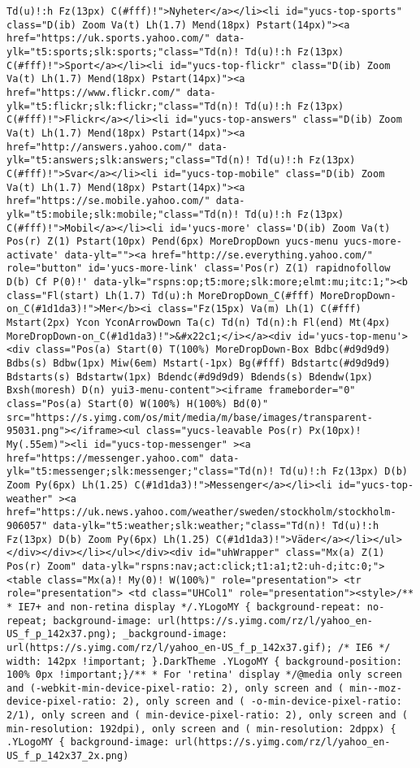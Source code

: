 \begin{verbatim}
Td(u)!:h Fz(13px) C(#fff)!">Nyheter</a></li><li id="yucs-top-sports" class="D(ib) Zoom Va(t) Lh(1.7) Mend(18px) Pstart(14px)"><a href="https://uk.sports.yahoo.com/" data-ylk="t5:sports;slk:sports;"class="Td(n)! Td(u)!:h Fz(13px) C(#fff)!">Sport</a></li><li id="yucs-top-flickr" class="D(ib) Zoom Va(t) Lh(1.7) Mend(18px) Pstart(14px)"><a href="https://www.flickr.com/" data-ylk="t5:flickr;slk:flickr;"class="Td(n)! Td(u)!:h Fz(13px) C(#fff)!">Flickr</a></li><li id="yucs-top-answers" class="D(ib) Zoom Va(t) Lh(1.7) Mend(18px) Pstart(14px)"><a href="http://answers.yahoo.com/" data-ylk="t5:answers;slk:answers;"class="Td(n)! Td(u)!:h Fz(13px) C(#fff)!">Svar</a></li><li id="yucs-top-mobile" class="D(ib) Zoom Va(t) Lh(1.7) Mend(18px) Pstart(14px)"><a href="https://se.mobile.yahoo.com/" data-ylk="t5:mobile;slk:mobile;"class="Td(n)! Td(u)!:h Fz(13px) C(#fff)!">Mobil</a></li><li id='yucs-more' class='D(ib) Zoom Va(t) Pos(r) Z(1) Pstart(10px) Pend(6px) MoreDropDown yucs-menu yucs-more-activate' data-ylt=""><a href="http://se.everything.yahoo.com/" role="button" id='yucs-more-link' class='Pos(r) Z(1) rapidnofollow D(b) Cf P(0)!' data-ylk="rspns:op;t5:more;slk:more;elmt:mu;itc:1;"><b class="Fl(start) Lh(1.7) Td(u):h MoreDropDown_C(#fff) MoreDropDown-on_C(#1d1da3)!">Mer</b><i class="Fz(15px) Va(m) Lh(1) C(#fff) Mstart(2px) Ycon YconArrowDown Ta(c) Td(n) Td(n):h Fl(end) Mt(4px) MoreDropDown-on_C(#1d1da3)!">&#x22c1;</i></a><div id='yucs-top-menu'><div class="Pos(a) Start(0) T(100%) MoreDropDown-Box Bdbc(#d9d9d9) Bdbs(s) Bdbw(1px) Miw(6em) Mstart(-1px) Bg(#fff) Bdstartc(#d9d9d9) Bdstarts(s) Bdstartw(1px) Bdendc(#d9d9d9) Bdends(s) Bdendw(1px) Bxsh(moresh) D(n) yui3-menu-content"><iframe frameborder="0" class="Pos(a) Start(0) W(100%) H(100%) Bd(0)" src="https://s.yimg.com/os/mit/media/m/base/images/transparent-95031.png"></iframe><ul class="yucs-leavable Pos(r) Px(10px)! My(.55em)"><li id="yucs-top-messenger" ><a href="https://messenger.yahoo.com" data-ylk="t5:messenger;slk:messenger;"class="Td(n)! Td(u)!:h Fz(13px) D(b) Zoom Py(6px) Lh(1.25) C(#1d1da3)!">Messenger</a></li><li id="yucs-top-weather" ><a href="https://uk.news.yahoo.com/weather/sweden/stockholm/stockholm-906057" data-ylk="t5:weather;slk:weather;"class="Td(n)! Td(u)!:h Fz(13px) D(b) Zoom Py(6px) Lh(1.25) C(#1d1da3)!">Väder</a></li></ul></div></div></li></ul></div><div id="uhWrapper" class="Mx(a) Z(1) Pos(r) Zoom" data-ylk="rspns:nav;act:click;t1:a1;t2:uh-d;itc:0;"> <table class="Mx(a)! My(0)! W(100%)" role="presentation"> <tr role="presentation"> <td class="UHCol1" role="presentation"><style>/** * IE7+ and non-retina display */.YLogoMY { background-repeat: no-repeat; background-image: url(https://s.yimg.com/rz/l/yahoo_en-US_f_p_142x37.png); _background-image: url(https://s.yimg.com/rz/l/yahoo_en-US_f_p_142x37.gif); /* IE6 */ width: 142px !important; }.DarkTheme .YLogoMY { background-position: 100% 0px !important;}/** * For 'retina' display */@media only screen and (-webkit-min-device-pixel-ratio: 2), only screen and ( min--moz-device-pixel-ratio: 2), only screen and ( -o-min-device-pixel-ratio: 2/1), only screen and ( min-device-pixel-ratio: 2), only screen and ( min-resolution: 192dpi), only screen and ( min-resolution: 2dppx) { .YLogoMY { background-image: url(https://s.yimg.com/rz/l/yahoo_en-US_f_p_142x37_2x.png) 
\end{verbatim}
